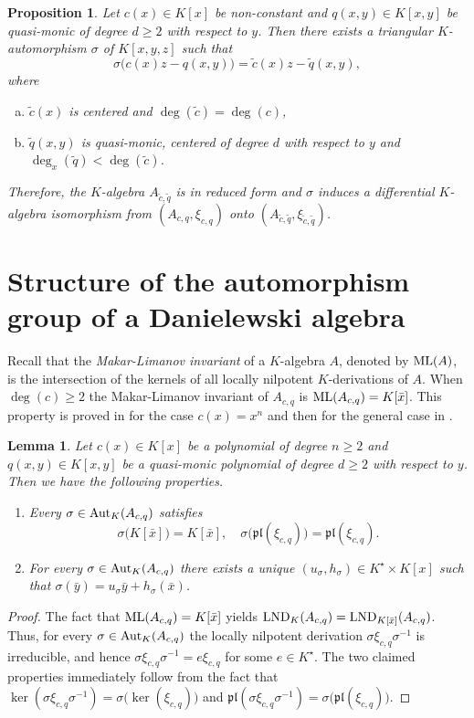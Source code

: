 \documentclass{article}
\newcommand \pl {\mathfrak{pl}}
\renewcommand \a {A}
\renewcommand \k {K}
\newcommand \auto {{\rm Aut}}
\newcommand \lnd {{\rm LND}}
\newcommand \ml {{\rm ML}}
\newtheorem{proposition}[theorem]{Proposition}
\newtheorem{lemma}[theorem]{Lemma}
\begin{document}
{\begin{proposition}\label{standardForm}Let $c(x)\in\k[x]$ be non-constant and $q(x,y)\in\k[x,y]$ be quasi-monic of degree $d\geq 2$ with respect to $y$. Then there exists a triangular $\k$-automorphism $\sigma$ of $\k[x,y,z]$ such that $$\sigma\big (c(x)z-q(x,y)\big)=\tilde{c}(x)z-\tilde{q}(x,y),$$ where 
	\begin{enumerate}[a.]
		\item $\tilde{c}(x)$ is centered and $\deg(\tilde{c})=\deg(c)$,
		\item $\tilde{q}(x,y)$ is quasi-monic, centered of degree $d$ with respect to $y$ and $\deg_x(\tilde{q})<\deg(\tilde{c})$.
	\end{enumerate}
	Therefore, the $\k$-algebra $\a_{\tilde{c},\tilde{q}}$ is in reduced form and $\sigma$ induces a differential $\k$-algebra isomorphism from $(\a_{c,q},\xi_{c,q})$ onto $(\a_{\tilde{c},\tilde{q}},\xi_{\tilde{c},\tilde{q}})$.
\end{proposition}

\section[Automorphism group of a Danielewski algebra]{Structure of the automorphism group of a Danielewski algebra}\label{sec:automorphismsDanielewski}Recall that the {\it Makar-Limanov invariant} of a $\k$-algebra $\a$, denoted by $\ml(\a)$, is the intersection of the kernels of all locally nilpotent $\k$-derivations of $\a$. When $\deg(c)\geq 2$ the Makar-Limanov invariant of $\a_{c,q}$ is $\ml(\a_{c,q})=\k[\bar{x}]$. This property is proved in \cite{makar-limanov_2001,poloni_2011} for the case $c(x)=x^n$ and then for the general case in \cite{bianchi_vesolo_2017}.

\begin{lemma}\label{decompositionLemma}Let $c(x)\in\k[x]$ be a polynomial of degree $n\geq 2$ and $q(x,y)\in \k[x,y]$ be a quasi-monic polynomial of degree $d\geq 2$ with respect to $y$. Then we have the following properties.
	\begin{enumerate}
		\item Every $\sigma\in\auto_{\k}(\a_{c,q})$ satisfies $$\sigma\big(\k[\bar{x}]\big)=\k[\bar{x}],\quad \sigma\big(\pl(\xi_{c,q})\big)=\pl(\xi_{c,q}).$$
		\item For every $\sigma\in\auto_{\k}(\a_{c,q})$ there exists a unique $(u_{\sigma},h_{\sigma})\in\k^{\star}\times\k[x]$ such that $\sigma(\bar{y})=u_{\sigma}\bar{y}+h_{\sigma}(\bar{x})$.
	\end{enumerate}
\end{lemma}
\begin{proof}
	 The fact that $\ml(\a_{c,q})=\k[\bar{x}]$ yields $\lnd_{\k}(\a_{c,q})=\lnd_{\k[\bar{x}]}(\a_{c,q})$. Thus, for every $\sigma\in\auto_{\k}(\a_{c,q})$ the locally nilpotent derivation $\sigma\xi_{c,q}\sigma^{-1}$ is irreducible, and hence $\sigma\xi_{c,q}\sigma^{-1}=e\xi_{c,q}$ for some $e\in\k^{\star}$. The two claimed properties immediately follow from the fact that $\ker(\sigma\xi_{c,q}\sigma^{-1})=\sigma\big(\ker(\xi_{c,q})\big)$ and $\pl(\sigma\xi_{c,q}\sigma^{-1})=\sigma\big(\pl(\xi_{c,q})\big)$.
	

\end{proof}}
\end{document}
